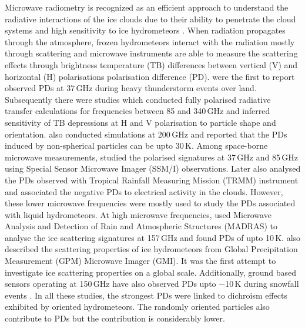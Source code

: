 \documentclass[amt, manuscript]{copernicus}
\begin{document}
Microwave radiometry is recognized as an efficient approach to understand the radiative interactions of the ice clouds due to their ability to penetrate the cloud systems and high sensitivity to ice hydrometeors \citep{}. When radiation propagates through the atmosphere, frozen hydrometeors interact with the radiation mostly through scattering and microwave instruments are able to measure the scattering effects through brightness temperature (TB) differences between vertical (V) and horizontal (H) polarisations polarisation difference (PD). \citet{spencer:heavy:83} were the first to report observed PDs at 37\,GHz during heavy thunderstorm events over land. Subsequently there were studies \citet{evans:} which conducted fully polarised radiative transfer calculations for frequencies between 85 and 340\,GHz and inferred sensitivity of TB depressions at H and V polarisation to particle shape and orientation. \citet{czekala:effect:98} also conducted simulations at 200\,GHz and reported that the PDs induced by non-spherical particles can be upto 30\,K. Among space-borne microwave measurements, \citet{prigent:micro:01} studied the polarised signatures at 37\,GHz and 85\,GHz using Special Sensor Microwave Imager (SSM/I) observations. Later \citet{prigent:relat:05} also analysed the PDs observed with Tropical Rainfall Measuring Mission (TRMM) instrument and associated the negative PDs to electrical activity in the clouds. However, these lower microwave frequencies were mostly used to study the PDs associated with liquid hydrometeors. At high microwave frequencies, \citet{defer:first:14} used Microwave Analysis and Detection of Rain and Atmospheric Structures (MADRAS) to analyse the ice scattering signatures at 157\,GHz and found PDs of upto 10\,K. \citet{gong:micro:17} also described the scattering properties of ice hydrometeors from  Global Precipitation Measurement (GPM) Microwave Imager (GMI). It was the first attempt to investigate ice scattering properties on a global scale. Additionally, ground based sensors operating at 150\,GHz have also observed PDs upto $-$10\,K during snowfall events \citep{xie:snow:12}. In all these studies, the strongest PDs were linked to dichroism effects exhibited by oriented hydrometeors. The randomly oriented particles also contribute to PDs but the contribution is considerably lower.
\end{document}
